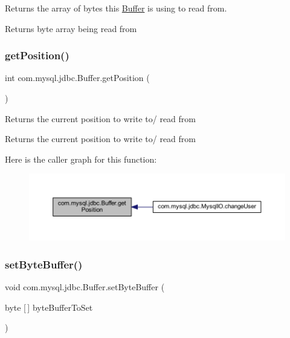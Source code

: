 Returns the array of bytes this \mbox{\hyperlink{classcom_1_1mysql_1_1jdbc_1_1_buffer}{Buffer}} is using to read from.

\begin{DoxyReturn}{Returns}
byte array being read from 
\end{DoxyReturn}
\mbox{\label{classcom_1_1mysql_1_1jdbc_1_1_buffer_a7dd4c64bfd124ad0a31a962364e7aaf6}} 
\subsubsection{\texorpdfstring{get\+Position()}{getPosition()}}
{\footnotesize\ttfamily int com.\+mysql.\+jdbc.\+Buffer.\+get\+Position (\begin{DoxyParamCaption}{ }\end{DoxyParamCaption})}

Returns the current position to write to/ read from

\begin{DoxyReturn}{Returns}
the current position to write to/ read from 
\end{DoxyReturn}
Here is the caller graph for this function\+:\nopagebreak
\begin{figure}[H]
\begin{center}
\leavevmode
\includegraphics[width=350pt]{classcom_1_1mysql_1_1jdbc_1_1_buffer_a7dd4c64bfd124ad0a31a962364e7aaf6_icgraph}
\end{center}
\end{figure}
\mbox{\label{classcom_1_1mysql_1_1jdbc_1_1_buffer_ad00a61ce402f1bfaf796e15cd2e70a8d}} 
\subsubsection{\texorpdfstring{set\+Byte\+Buffer()}{setByteBuffer()}}
{\footnotesize\ttfamily void com.\+mysql.\+jdbc.\+Buffer.\+set\+Byte\+Buffer (\begin{DoxyParamCaption}\item[{byte \mbox{[}$\,$\mbox{]}}]{byte\+Buffer\+To\+Set }\end{DoxyParamCaption})}

